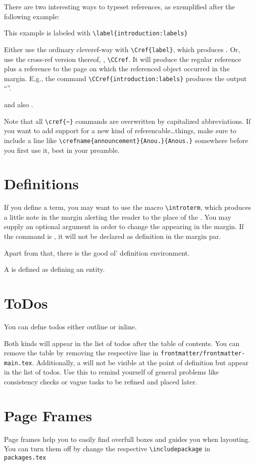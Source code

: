 There are two interesting ways to typeset references, as exemplified after the following example:
\begin{example}\label{introduction:labels}
	This example is labeled with \lstinline|\label{introduction:labels}|
\end{example}

Either use the ordinary cleveref-way with \lstinline|\Cref{label}|, which produces .
Or, use the cross-ref version thereof, \ie, \lstinline!\CCref!. 
It will produce the regular reference plus a reference to the page on which the referenced object occurred in the margin.
E.g., the command \lstinline!\CCref{introduction:labels}! produces the output ``''.

 and also .

Note that all \lstinline|\cref{~}| commands are overwritten by capitalized abbreviations. 
If you want to add support for a new kind of referencable\dots things, make sure to include a line like \lstinline!\crefname{announcement}{Anou.}{Anous.}! somewhere before you first use it, best in your preamble.

\section{Definitions}\label{introduction:definitions}

If you define a term, you may want to use the macro \lstinline{\introterm}, which produces a little note in the margin alerting the reader to the place of the .
You may supply an optional argument in order to change the  appearing in the margin. If the command is , it will not be declared as definition in the margin par.

Apart from that, there is the good ol' definition environment.
\begin{definition}[Definition]
	A  is defined as defining an entity.
\end{definition}

\section{ToDos}\label{introduction:todos}
You can defne todos either outline or inline. 

Both kinds will appear in the list of todos after the table of contents. You can remove the table by removing the respective line in \lstinline{frontmatter/frontmatter-main.tex}.
Additionally, a  will not be visible at the point of definition but appear in the list of todos. Use this to remind yourself of general problems like consistency checks or vague tasks to be refined and placed later. 

\section{Page Frames}\label{introduction:pageframes}

Page frames help you to easily find overfull boxes and guides you when layouting. You can turn them off by change the respective \lstinline{\includepackage} in \lstinline{packages.tex}

